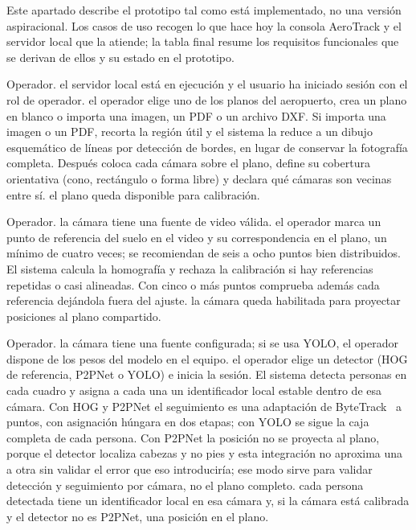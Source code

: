 Este apartado describe el prototipo tal como está implementado, no una
versión aspiracional. Los casos de uso recogen lo que hace hoy la consola
AeroTrack y el servidor local que la atiende; la tabla final resume los
requisitos funcionales que se derivan de ellos y su estado en el
prototipo.

  {Operador.}
  {el servidor local está en ejecución y el usuario ha iniciado sesión con
   el rol de operador.}
  {el operador elige uno de los planos del aeropuerto, crea un plano en
   blanco o importa una imagen, un PDF o un archivo DXF. Si importa una
   imagen o un PDF, recorta la región útil y el sistema la reduce a un
   dibujo esquemático de líneas por detección de bordes, en lugar de
   conservar la fotografía completa. Después coloca cada cámara sobre el
   plano, define su cobertura orientativa (cono, rectángulo o forma libre)
   y declara qué cámaras son vecinas entre sí.}
  {el plano queda disponible para calibración.}

  {Operador.}
  {la cámara tiene una fuente de video válida.}
  {el operador marca un punto de referencia del suelo en el video y su
   correspondencia en el plano, un mínimo de cuatro veces; se recomiendan
   de seis a ocho puntos bien distribuidos. El sistema calcula la
   homografía y rechaza la calibración si hay referencias repetidas o casi
   alineadas. Con cinco o más puntos comprueba además cada referencia
   dejándola fuera del ajuste.}
  {la cámara queda habilitada para proyectar posiciones al plano
   compartido.}

  {Operador.}
  {la cámara tiene una fuente configurada; si se usa YOLO, el operador
   dispone de los pesos del modelo en el equipo.}
  {el operador elige un detector (HOG de referencia, P2PNet o YOLO) e
   inicia la sesión. El sistema detecta personas en cada cuadro y asigna a
   cada una un identificador local estable dentro de esa cámara. Con HOG y
   P2PNet el seguimiento es una adaptación de
   ByteTrack~\cite{Zhang_2022_ECCV} a puntos, con asignación húngara en dos
   etapas; con YOLO se sigue la caja completa de cada persona. Con P2PNet
   la posición no se proyecta al plano, porque el detector localiza
   cabezas y no pies y esta integración no aproxima una a otra sin validar
   el error que eso introduciría; ese modo sirve para validar detección y
   seguimiento por cámara, no el plano completo.}
  {cada persona detectada tiene un identificador local en esa cámara y, si
   la cámara está calibrada y el detector no es P2PNet, una posición en el
   plano.}

